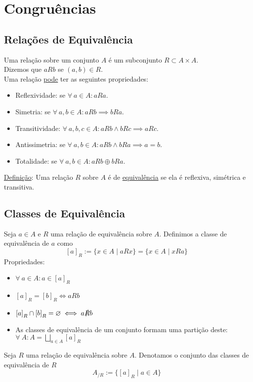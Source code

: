 \documentclass{article}
\begin{document}
\section{Congruências}

\subsection{Relações de Equivalência}
Uma relação sobre um conjunto $A$ é um subconjunto $R \subset A \times A$. \\
Dizemos que $a R b$ se $(a,b) \in R$. \\[5pt]
Uma relação \uline{pode} ter as seguintes propriedades:
\begin{itemize}
  \item Reflexividade: se $\forall \: a \in A: aRa$.
  \item Simetria: se $\forall \: a,b \in A: aRb \implies bRa$.
  \item Transitividade: $\forall \: a,b,c \in A: aRb \land bRc \implies aRc$.
  \item Antissimetria: se $\forall \: a,b \in A: aRb \land bRa \implies a = b$.
  \item Totalidade: se $\forall \: a,b \in A: aRb \oplus bRa$.
\end{itemize}
\uline{Definição}: Uma relação $R$ sobre $A$ é de \uline{equivalência} se ela é reflexiva, simétrica e transitiva.


\pagebreak


\subsection{Classes de Equivalência}
Seja $a \in A$ e $R$ uma relação de equivalência sobre $A$. Definimos a classe de equivalência de $a$ como
\[ {[a]}_R := \{ x \in A \mid aRx \} = \{ x \in A \mid xRa \} \]
Propriedades:
\begin{itemize}
  \item $\forall \: a \in A: a \in {[a]}_R$
  \item ${[a]}_R = {[b]}_R \iff aRb$
  \item ${[a]}_R \cap {[b]}_R = \varnothing \iff a\slashed{R}b$
  \item As classes de equivalência de um conjunto formam uma partição deste: $\forall \: A: A = \bigsqcup\limits_{a \in A} {[a]}_R$
\end{itemize}
Seja $R$ uma relação de equivalência sobre $A$. Denotamos o conjunto das classes de equivalência de $R$
\[ A_{/R} := \{ {[a]}_R \mid a \in A \} \]
\end{document}
